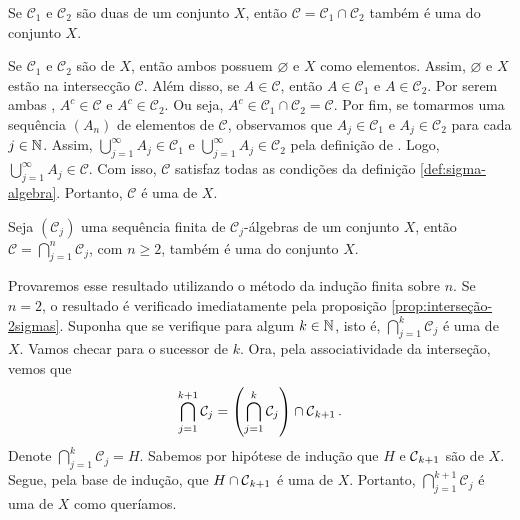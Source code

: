 \begin{proposition}
\label{prop:interseção-2sigmas}
    Se $\mathcal{C}_1$ e $\mathcal{C}_2$ são duas \sigals de um conjunto $X$, então $\mathcal{C} = \mathcal{C}_1 \cap \mathcal{C}_2$ também é uma \sigal do conjunto $X$.
\end{proposition}

\begin{prova}
    Se $\mathcal{C}_1$ e $\mathcal{C}_2$ são \sigals de $X$, então ambos possuem $\varnothing$ e $X$ como elementos.
    Assim, $\varnothing$ e $X$ estão na intersecção $\mathcal{C}$.
    Além disso, se $A \in \mathcal{C}$, então $A \in \mathcal{C}_1$ e $A \in \mathcal{C}_2$. 
    Por serem ambas \sigals, $A^c \in \mathcal{C}$ e $A^c \in \mathcal{C}_2$.
    Ou seja, $A^c \in \mathcal{C}_1 \cap \mathcal{C}_2 = \mathcal{C}$.
    Por fim, se tomarmos uma sequência $(A_n)$ de elementos de $\mathcal{C}$, observamos que $A_j \in \mathcal{C}_1$ e $A_j \in \mathcal{C}_2$ para cada $j \in \operatorname{\mathbb{N}}$.
    Assim, $\displaystyle \bigcup_{j = 1}^\infty A_j \in \mathcal{C}_1$ e 
    $\displaystyle \bigcup_{j = 1}^\infty A_j \in \mathcal{C}_2$ pela definição de \sigal.
    Logo, $\displaystyle \bigcup_{j = 1}^\infty A_j \in \mathcal{C}$.
    Com isso, $\mathcal{C}$ satisfaz todas as condições da definição \ref{def:sigma-algebra}. 
    Portanto, $\mathcal{C}$ é uma \sigal de $X$.
\end{prova}

\begin{proposition}
\label{prop:interseção-sigmas}
    Seja $(\mathcal{C}_j)$ uma sequência finita de $\mathcal{C}_j$-álgebras de um conjunto $X$, então 
    $\mathcal{C} = \displaystyle \bigcap_{j =1}^n\mathcal{C}_j$, com $n \geq 2$, também é uma \sigal do conjunto $X$.
    
\end{proposition}
\begin{prova}
    Provaremos esse resultado utilizando o método da indução finita sobre $n$.
    Se $n = 2$, o resultado é verificado imediatamente pela proposição \ref{prop:interseção-2sigmas}.
    Suponha que se verifique para algum $k \in \operatorname{\mathbb{N}}$, isto é, $\displaystyle \bigcap_{j =1}^k\mathcal{C}_j$ é uma \sigal de $X$.
    Vamos checar para o sucessor de $k$.
    Ora, pela associatividade da interseção, vemos que 
    \begin{align*}
        \displaystyle \bigcap_{j =1}^{k+1}\mathcal{C}_j = \left(\displaystyle \bigcap_{j =1}^k\mathcal{C}_j\right) \cap \operatorname{\mathcal{C}}_{k+1}.
  	\end{align*}
	Denote $\displaystyle \bigcap_{j =1}^k\mathcal{C}_j = H$. 
	Sabemos por hipótese de indução que $H$  e $\operatorname{\mathcal{C}}_{k+1}$ são  \sigals de $X$. 
	Segue, pela base de indução, que $H \cap \operatorname{\mathcal{C}}_{k+1}$ é uma \sigal de $X$.
	Portanto, $\displaystyle \bigcap_{j =1}^{k+1}\mathcal{C}_j$ é uma \sigal de $X$ como queríamos.
\end{prova}

